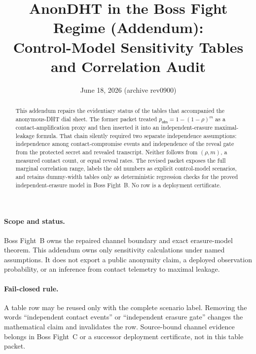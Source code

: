 \documentclass[11pt]{article}
\title{AnonDHT in the Boss Fight Regime (Addendum):\\ Control-Model Sensitivity Tables and Correlation Audit}
\author{}
\date{June 18, 2026 (archive rev0900)}
\begin{document}
\maketitle

\begin{abstract}
This addendum repairs the evidentiary status of the tables that accompanied the anonymous-DHT dial sheet.
The former packet treated \(p_{\mathsf{obs}}=1-(1-\rho)^m\) as a contact-amplification proxy and then inserted it into an independent-erasure maximal-leakage formula. That chain silently required two separate independence assumptions: independence among contact-compromise events and independence of the reveal gate from the protected secret and revealed transcript.
Neither follows from \((\rho,m)\), a measured contact count, or equal reveal rates.
The revised packet exposes the full marginal correlation range, labels the old numbers as explicit control-model scenarios, and retains dummy-width tables only as deterministic regression checks for the proved independent-erasure model in Boss Fight~B.
No row is a deployment certificate.
\end{abstract}

\paragraph{Scope and status.}
Boss Fight~B owns the repaired channel boundary and exact erasure-model theorem. This addendum owns only sensitivity calculations under named assumptions. It does not export a public anonymity claim, a deployed observation probability, or an inference from contact telemetry to maximal leakage.\cite{series:bossfightA,series:bossfightB,series:traceifaces}

\paragraph{Fail-closed rule.}
A table row may be reused only with the complete scenario label. Removing the words ``independent contact events'' or ``independent erasure gate'' changes the mathematical claim and invalidates the row. Source-bound channel evidence belongs in Boss Fight~C or a successor deployment certificate, not in this table packet.\cite{series:bossfightC}
\end{document}
